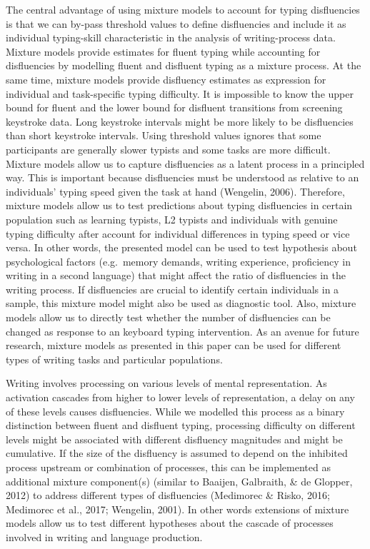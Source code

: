 \documentclass[
  english,
  man,mask,floatsintext]{apa7}
\begin{document}
The central advantage of using mixture models to account for typing disfluencies is that we can by-pass threshold values to define disfluencies and include it as individual typing-skill characteristic in the analysis of writing-process data. Mixture models provide estimates for fluent typing while accounting for disfluencies by modelling fluent and disfluent typing as a mixture process. At the same time, mixture models provide disfluency estimates as expression for individual and task-specific typing difficulty. It is impossible to know the upper bound for fluent and the lower bound for disfluent transitions from screening keystroke data. Long keystroke intervals might be more likely to be disfluencies than short keystroke intervals. Using threshold values ignores that some participants are generally slower typists and some tasks are more difficult. Mixture models allow us to capture disfluencies as a latent process in a principled way. This is important because disfluencies must be understood as relative to an individuals' typing speed given the task at hand (Wengelin, 2006). Therefore, mixture models allow us to test predictions about typing disfluencies in certain population such as learning typists, L2 typists and individuals with genuine typing difficulty after account for individual differences in typing speed or vice versa. In other words, the presented model can be used to test hypothesis about psychological factors (e.g.~memory demands, writing experience, proficiency in writing in a second language) that might affect the ratio of disfluencies in the writing process. If disfluencies are crucial to identify certain individuals in a sample, this mixture model might also be used as diagnostic tool. Also, mixture models allow us to directly test whether the number of disfluencies can be changed as response to an keyboard typing intervention. As an avenue for future research, mixture models as presented in this paper can be used for different types of writing tasks and particular populations.

Writing involves processing on various levels of mental representation. As activation cascades from higher to lower levels of representation, a delay on any of these levels causes disfluencies. While we modelled this process as a binary distinction between fluent and disfluent typing, processing difficulty on different levels might be associated with different disfluency magnitudes and might be cumulative. If the size of the disfluency is assumed to depend on the inhibited process upstream or combination of processes, this can be implemented as additional mixture component(s) (similar to Baaijen, Galbraith, \& de Glopper, 2012) to address different types of disfluencies (Medimorec \& Risko, 2016; Medimorec et al., 2017; Wengelin, 2001). In other words extensions of mixture models allow us to test different hypotheses about the cascade of processes involved in writing and language production.
\end{document}
